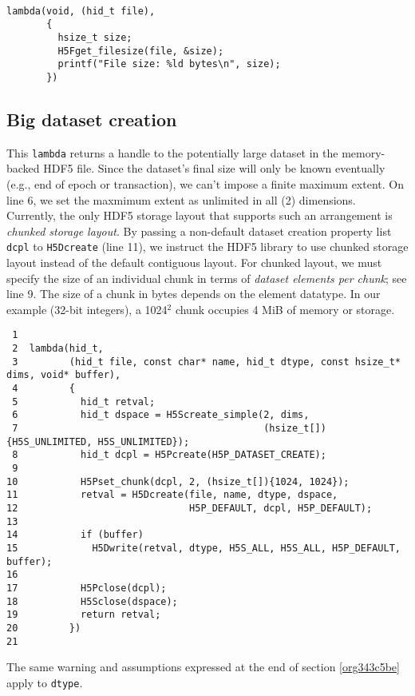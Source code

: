 \documentclass[a4paper, 12pt]{article}
\begin{document}
\begin{verbatim}

lambda(void, (hid_t file),
       {
         hsize_t size;
         H5Fget_filesize(file, &size);
         printf("File size: %ld bytes\n", size);
       })

\end{verbatim}

\subsection{Big dataset creation \label{orgb438884}}
\label{sec:org92b93dd}

This \texttt{lambda} returns a handle to the potentially large dataset in the
memory-backed HDF5 file. Since the dataset's final size will only be known
eventually (e.g., end of epoch or transaction), we can't impose a finite
maximum extent. On line 6, we set the maxmimum extent as unlimited in
all (2) dimensions. Currently, the only HDF5 storage layout that supports such
an arrangement is \emph{chunked storage layout}. By passing a non-default dataset
creation property list \texttt{dcpl} to \texttt{H5Dcreate} (line 11), we instruct the
HDF5 library to use chunked storage layout instead of the default contiguous
layout. For chunked layout, we must specify the size of an individual chunk in
terms of \emph{dataset elements per chunk}; see line 9. The size of a
chunk in bytes depends on the element datatype.  In our example (32-bit
integers), a 1024\(^{\text{2}}\) chunk occupies 4 MiB of memory or storage.

\begin{verbatim}
 1
 2  lambda(hid_t,
 3         (hid_t file, const char* name, hid_t dtype, const hsize_t* dims, void* buffer),
 4         {
 5           hid_t retval;
 6           hid_t dspace = H5Screate_simple(2, dims,
 7                                           (hsize_t[]){H5S_UNLIMITED, H5S_UNLIMITED});
 8           hid_t dcpl = H5Pcreate(H5P_DATASET_CREATE);
 9
10           H5Pset_chunk(dcpl, 2, (hsize_t[]){1024, 1024});
11           retval = H5Dcreate(file, name, dtype, dspace,
12                              H5P_DEFAULT, dcpl, H5P_DEFAULT);
13
14           if (buffer)
15             H5Dwrite(retval, dtype, H5S_ALL, H5S_ALL, H5P_DEFAULT, buffer);
16
17           H5Pclose(dcpl);
18           H5Sclose(dspace);
19           return retval;
20         })
21
\end{verbatim}

The same warning and assumptions expressed at the end of section
\ref{org343c5be} apply to \texttt{dtype}.
\end{document}
